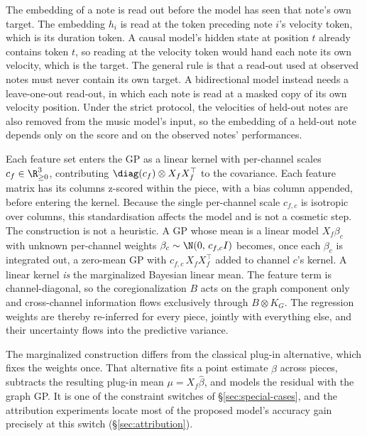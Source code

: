 The embedding of a note is read out before the model has seen that note's
own target. The embedding $h_i$ is read at the token preceding note $i$'s
velocity token, which is its duration token. A causal model's hidden state
at position $t$ already contains token $t$, so reading at the velocity token
would hand each note its own velocity, which is the target. The general rule
is that a read-out used at observed notes must never contain its own target.
A bidirectional model instead needs a leave-one-out read-out, in which each
note is read at a masked copy of its own velocity position. Under the strict
protocol, the velocities of held-out notes are also removed from the music
model's input, so the embedding of a held-out note depends only on the score
and on the observed notes' performances.

Each feature set enters the GP as a linear kernel with per-channel scales
$c_f \in \R^{3}_{\ge 0}$, contributing $\diag(c_f) \otimes X_f X_f^\top$ to
the covariance. Each feature matrix has its columns z-scored within the
piece, with a bias column appended, before entering the kernel. Because the
single per-channel scale $c_{f,c}$ is isotropic over columns, this
standardisation affects the model and is not a cosmetic step. The
construction is not a heuristic. A GP whose mean is a linear model
$X_f \beta_c$ with unknown per-channel weights
$\beta_c \sim \N(0,\, c_{f,c} I)$ becomes, once each $\beta_c$ is integrated
out, a zero-mean GP with $c_{f,c}\, X_f X_f^\top$ added to channel $c$'s
kernel. A linear kernel \emph{is} the marginalized Bayesian linear mean. The
feature term is channel-diagonal, so the coregionalization $B$ acts on the
graph component only and cross-channel information flows exclusively through
$B \otimes K_G$. The regression weights are thereby re-inferred for every
piece, jointly with everything else, and their uncertainty flows into the
predictive variance.

The marginalized construction differs from the classical plug-in
alternative, which fixes the weights once. That alternative fits a point
estimate $\hat\beta$ across pieces, subtracts the resulting plug-in mean
$\mu = X_f \hat\beta$, and models the residual with the graph GP. It is one
of the constraint switches of \S\ref{sec:special-cases}, and the attribution
experiments locate most of the proposed model's accuracy gain precisely at
this switch (\S\ref{sec:attribution}).

